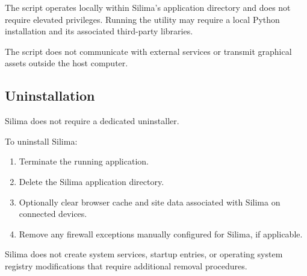 The script operates locally within Silima's application directory
and does not require elevated privileges. Running the utility
may require a local Python installation and its associated
third-party libraries.

The script does not communicate with external services or
transmit graphical assets outside the host computer.

\subsection{Uninstallation}

Silima does not require a dedicated uninstaller.

To uninstall Silima:
\begin{enumerate}
    \item Terminate the running application.
    \item Delete the Silima application directory.
    \item Optionally clear browser cache and site data associated
          with Silima on connected devices.
    \item Remove any firewall exceptions manually configured
          for Silima, if applicable.
\end{enumerate}

Silima does not create system services, startup entries, or
operating system registry modifications that require additional
removal procedures.
